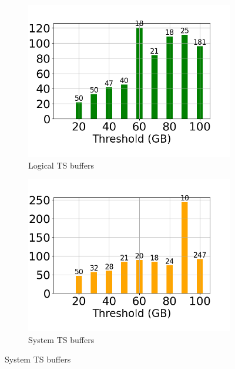 \begin{figure}
	\centering
	\begin{subfigure}[c]{0.45\textwidth}
		\includegraphics[width=1\textwidth]   {figures/Experiments/Dynamic/Progress/2/average_query_time_per_batch_version_999777015_10485760_10_delay[2].png}
		\caption{Logical TS buffers}
		\label{fig:progress-queries-2-logical}
	\end{subfigure}
	\begin{subfigure}[c]{0.45\textwidth}
		\includegraphics[width=1\textwidth]   {figures/Experiments/Dynamic/Progress/2/average_query_time_per_batch_version_999777018_10485760_10_delay[2].png}
		\caption{System TS buffers}
		\label{fig:progress-queries-2-system}
	\end{subfigure}

\end{figure}
